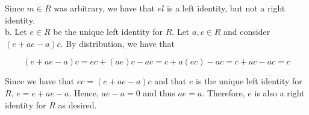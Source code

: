 \begin{solution}
    Since $m\in R$ was arbitrary, we have that $el$ is a left identity, but not a right identity.\\

    b. Let $e\in R$ be the unique left identity for $R$. Let $a,c\in R$ and consider $(e+ae-a)c$. By
    distribution, we have that
    
    $$(e+ae-a)c=ec+(ae)c-ac=c+a(ec)-ac=c+ac-ac=c$$
    
    Since we have that $ec=(e+ae-a)c$ and that $e$ is the unique left identity for $R$, $e=e+ae-a$.
    Hence, $ae-a=0$ and thus $ae=a$. Therefore, $e$ is also a right identity for $R$ as desired.

\end{solution}